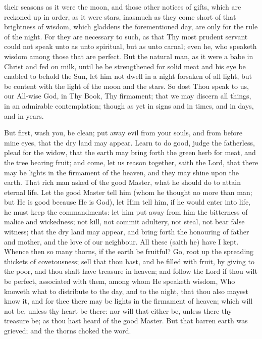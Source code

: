 \documentclass[b5paper,openright,12pt,twoside]{book}
\begin{document}
their seasons as it were the moon, and those other notices of gifts,
which are reckoned up in order, as it were stars, inasmuch as they come
short of that brightness of wisdom, which gladdens the forementioned
day, are only for the rule of the night. For they are necessary to such,
as that Thy most prudent servant could not speak unto as unto spiritual,
but as unto carnal; even he, who speaketh wisdom among those that are
perfect. But the natural man, as it were a babe in Christ and fed on
milk, until he be strengthened for solid meat and his eye be enabled to
behold the Sun, let him not dwell in a night forsaken of all light, but
be content with the light of the moon and the stars. So dost Thou speak
to us, our All-wise God, in Thy Book, Thy firmament; that we may discern
all things, in an admirable contemplation; though as yet in signs and in
times, and in days, and in years.

But first, wash you, be clean; put away evil from your souls, and from
before mine eyes, that the dry land may appear. Learn to do good, judge
the fatherless, plead for the widow, that the earth may bring forth the
green herb for meat, and the tree bearing fruit; and come, let us reason
together, saith the Lord, that there may be lights in the firmament of
the heaven, and they may shine upon the earth. That rich man asked of
the good Master, what he should do to attain eternal life. Let the
good Master tell him (whom he thought no more than man; but He is good
because He is God), let Him tell him, if he would enter into life, he
must keep the commandments: let him put away from him the bitterness
of malice and wickedness; not kill, not commit adultery, not steal, not
bear false witness; that the dry land may appear, and bring forth the
honouring of father and mother, and the love of our neighbour. All these
(saith he) have I kept. Whence then so many thorns, if the earth be
fruitful? Go, root up the spreading thickets of covetousness; sell that
thou hast, and be filled with fruit, by giving to the poor, and thou
shalt have treasure in heaven; and follow the Lord if thou wilt be
perfect, associated with them, among whom He speaketh wisdom, Who
knoweth what to distribute to the day, and to the night, that thou also
mayest know it, and for thee there may be lights in the firmament of
heaven; which will not be, unless thy heart be there: nor will that
either be, unless there thy treasure be; as thou hast heard of the good
Master. But that barren earth was grieved; and the thorns choked the
word.
\end{document}
